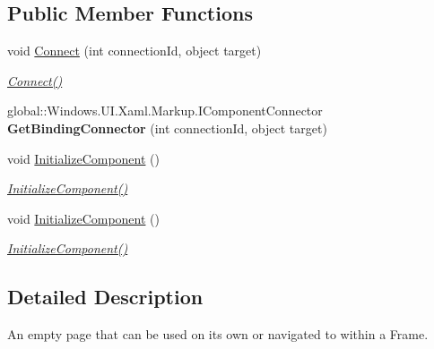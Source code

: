 \subsection*{Public Member Functions}
\begin{DoxyCompactItemize}
\item 
void \hyperlink{class_test_app_h_l_1_1_universal_windows_1_1_main_page_ab419cabd633125bc70761adf37625741}{Connect} (int connection\+Id, object target)
\begin{DoxyCompactList}\small\item\em \hyperlink{class_test_app_h_l_1_1_universal_windows_1_1_main_page_ab419cabd633125bc70761adf37625741}{Connect()} \end{DoxyCompactList}\item 
global\+::\+Windows.\+U\+I.\+Xaml.\+Markup.\+I\+Component\+Connector {\bfseries Get\+Binding\+Connector} (int connection\+Id, object target)\hypertarget{class_test_app_h_l_1_1_universal_windows_1_1_main_page_a1c7115c106b6756882a6df6f7f45e73e}{}\label{class_test_app_h_l_1_1_universal_windows_1_1_main_page_a1c7115c106b6756882a6df6f7f45e73e}

\item 
void \hyperlink{class_test_app_h_l_1_1_universal_windows_1_1_main_page_aa4eb0463d2ae6bda7bff947904b84a3c}{Initialize\+Component} ()
\begin{DoxyCompactList}\small\item\em \hyperlink{class_test_app_h_l_1_1_universal_windows_1_1_main_page_aa4eb0463d2ae6bda7bff947904b84a3c}{Initialize\+Component()} \end{DoxyCompactList}\item 
void \hyperlink{class_test_app_h_l_1_1_universal_windows_1_1_main_page_aa4eb0463d2ae6bda7bff947904b84a3c}{Initialize\+Component} ()
\begin{DoxyCompactList}\small\item\em \hyperlink{class_test_app_h_l_1_1_universal_windows_1_1_main_page_aa4eb0463d2ae6bda7bff947904b84a3c}{Initialize\+Component()} \end{DoxyCompactList}\end{DoxyCompactItemize}


\subsection{Detailed Description}
An empty page that can be used on its own or navigated to within a Frame. 



